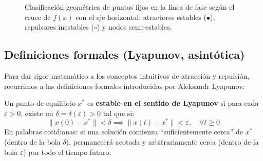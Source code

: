 \begin{figure}[htbp]
\caption{Clasificación geométrica de puntos fijos en la línea de fase según el cruce de $f(x)$ con el eje horizontal: atractores estables ($\bullet$), repulsores inestables ($\circ$) y nodos semi-estables.}
\label{fig:clasificacion_puntos_fijos}
\end{figure}

\subsection{Definiciones formales (Lyapunov, asintótica)}

Para dar rigor matemático a los conceptos intuitivos de atracción y repulsión, recurrimos a las definiciones formales introducidas por Aleksandr Lyapunov:

\begin{definition}
    Un punto de equilibrio $x^*$ es \textbf{estable en el sentido de Lyapunov} si para cada $\varepsilon > 0$, existe un $\delta = \delta(\varepsilon) > 0$ tal que si:
    \begin{equation}
        \|x(0) - x^*\| < \delta \implies \|x(t) - x^*\| < \varepsilon, \quad \forall t \ge 0
    \end{equation}
    En palabras cotidianas: si una solución comienza ``suficientemente cerca'' de $x^*$ (dentro de la bola $\delta$), permanecerá acotada y arbitrariamente cerca (dentro de la bola $\varepsilon$) por todo el tiempo futuro.
\end{definition}

